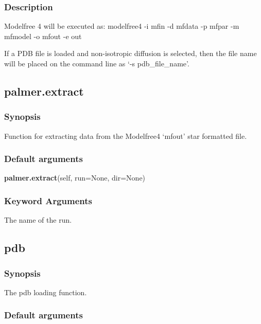 \subsubsection{Description}

Modelfree 4 will be executed as:
    modelfree4 -i mfin -d mfdata -p mfpar -m mfmodel -o mfout -e out

If a PDB file is loaded and non-isotropic diffusion is selected, then the file name will be
placed on the command line as `-s pdb\_file\_name'.


\newpage

\subsection{palmer.extract}


\subsubsection{Synopsis}

Function for extracting data from the Modelfree4 `mfout' star formatted file.

\subsubsection{Default arguments}

\textsf{\textbf{palmer.extract}(self, run=None, dir=None)}


\subsubsection{Keyword Arguments}

  The name of the run.


\newpage

\subsection{pdb}


\subsubsection{Synopsis}

The pdb loading function.

\subsubsection{Default arguments}

